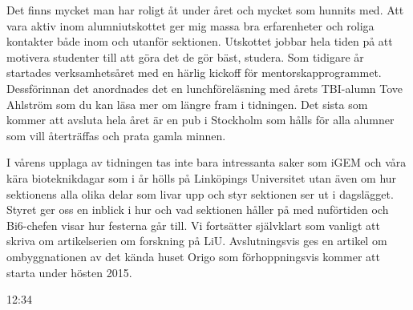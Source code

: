 						{Det finns mycket man har roligt åt under året och mycket som hunnits med. Att vara aktiv inom alumniutskottet ger mig massa bra erfarenheter och roliga kontakter både inom och utanför sektionen. Utskottet jobbar hela tiden på att motivera studenter till att göra det de gör bäst, studera. Som tidigare år startades verksamhetsåret med en härlig kickoff för mentorskapprogrammet. Dessförinnan det anordnades det en lunchföreläsning med årets TBI-alumn Tove Ahlström som du kan läsa mer om längre fram i tidningen. Det sista som kommer att avsluta hela året är en pub i Stockholm som hålls för alla alumner som vill återträffas och prata gamla minnen.

I vårens upplaga av tidningen tas inte bara intressanta saker som iGEM och våra kära bioteknikdagar som i år hölls på Linköpings Universitet utan även om hur sektionens alla olika delar som livar upp och styr sektionen ser ut i dagslägget. Styret ger oss en inblick i hur och vad sektionen håller på med nuförtiden och Bi6-chefen visar hur festerna går till. Vi fortsätter självklart som vanligt att skriva om artikelserien om forskning på LiU. Avslutningsvis ges en artikel om ombyggnationen av det kända huset Origo som förhoppningsvis kommer att starta under hösten 2015.}%
						{12:34}




